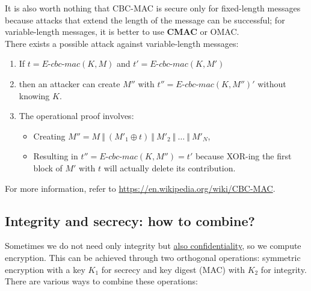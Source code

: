 It is also worth nothing that CBC-MAC is secure only for fixed-length messages because attacks that extend the length of the message can be successful; for variable-length messages, it is better to use \textbf{CMAC} or OMAC.\\
There exists a possible attack against variable-length messages:
\begin{enumerate}
    \item If $t = \textit{E-cbc-mac}(K, M)$ and $t' = \textit{E-cbc-mac}(K, M')$ 
    \item then an attacker can create $M''$ with $t'' = \textit{E-cbc-mac}(K, M'')'$ without knowing $K$.
    \item The operational proof involves:
    \begin{itemize}
        \item Creating $M'' = M \ \Vert \ (M'_1 \oplus t) \ \Vert \ M'_2 \ \Vert \ \ldots \ \Vert \ M'_N$,
        \item Resulting in $t'' = \textit{E-cbc-mac}(K, M'') = t'$ because XOR-ing the first block of $M'$ with $t$ will actually delete its contribution.
    \end{itemize}
\end{enumerate}
For more information, refer to \url{https://en.wikipedia.org/wiki/CBC-MAC}.


\subsection{Integrity and secrecy: how to combine?}
Sometimes we do not need only integrity but \underline{also confidentiality}, so we compute encryption. This can be achieved through two orthogonal operations: symmetric encryption with a key \(K_1\) for secrecy and key digest (MAC) with \(K_2\) for integrity. There are various ways to combine these operations:

